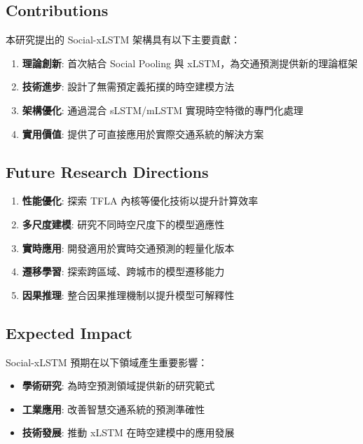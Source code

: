 \documentclass[11pt,a4paper]{article}
\begin{document}
\subsection{Contributions}

本研究提出的 Social-xLSTM 架構具有以下主要貢獻：

\begin{enumerate}
\item \textbf{理論創新}: 首次結合 Social Pooling 與 xLSTM，為交通預測提供新的理論框架

\item \textbf{技術進步}: 設計了無需預定義拓撲的時空建模方法

\item \textbf{架構優化}: 通過混合 sLSTM/mLSTM 實現時空特徵的專門化處理

\item \textbf{實用價值}: 提供了可直接應用於實際交通系統的解決方案
\end{enumerate}

\subsection{Future Research Directions}

\begin{enumerate}
\item \textbf{性能優化}: 探索 TFLA 內核等優化技術以提升計算效率

\item \textbf{多尺度建模}: 研究不同時空尺度下的模型適應性

\item \textbf{實時應用}: 開發適用於實時交通預測的輕量化版本

\item \textbf{遷移學習}: 探索跨區域、跨城市的模型遷移能力

\item \textbf{因果推理}: 整合因果推理機制以提升模型可解釋性
\end{enumerate}

\subsection{Expected Impact}

Social-xLSTM 預期在以下領域產生重要影響：

\begin{itemize}
\item \textbf{學術研究}: 為時空預測領域提供新的研究範式
\item \textbf{工業應用}: 改善智慧交通系統的預測準確性
\item \textbf{技術發展}: 推動 xLSTM 在時空建模中的應用發展
\end{itemize}
\end{document}
